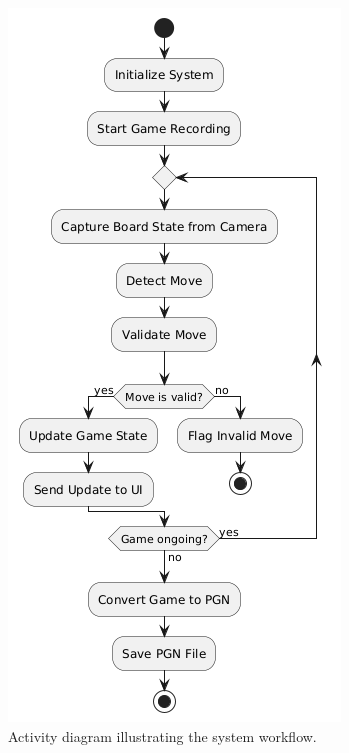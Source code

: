 \begin{figure}[H]
\begin{minipage}[t]{0.45\textwidth}
        \includegraphics[width=\linewidth]{figures/results/uml/activity-2.png}
        \caption[Activity Diagram]{Activity diagram illustrating the system workflow.}
        \label{fig:activity}
    \end{minipage}
\end{figure}




